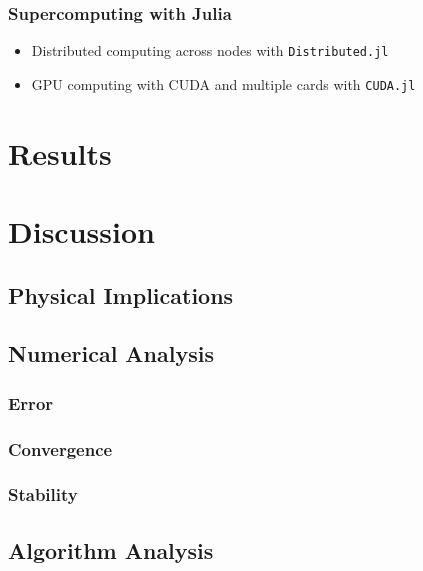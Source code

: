 \documentclass{article}
\begin{document}
        \subsubsection{Supercomputing with Julia}

            \begin{itemize}
                \item Distributed computing across nodes with \verb|Distributed.jl|
                \item GPU computing with CUDA and multiple cards with \verb|CUDA.jl|
            \end{itemize}

    \section{Results}

    \section{Discussion}
            
            \subsection{Physical Implications}

            \subsection{Numerical Analysis}
            
                \subsubsection{Error}

                \subsubsection{Convergence}

                \subsubsection{Stability}

            \subsection{Algorithm Analysis}
\end{document}
